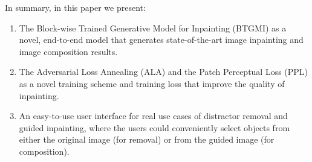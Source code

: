 In summary, in this paper we present:
\begin{enumerate}
\item The Block-wise Trained Generative Model for Inpainting (BTGMI) as a novel, end-to-end model that generates state-of-the-art image inpainting and image composition results.  
\item The Adversarial Loss Annealing (ALA) and the Patch Perceptual Loss (PPL) as a novel training scheme and training loss that improve the quality of inpainting. 
\item An easy-to-use user interface for real use cases of distractor removal and guided inpainting, where the users could conveniently select objects from either the original image (for removal) or from the guided image (for composition).
\end{enumerate}